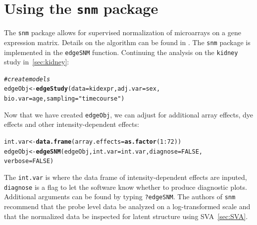 \documentclass{article}\usepackage[]{graphicx}\usepackage[]{color}
\makeatletter
\newcommand{\hlnum}[1]{\textcolor[rgb]{0.686,0.059,0.569}{#1}}%
\newcommand{\hlstr}[1]{\textcolor[rgb]{0.192,0.494,0.8}{#1}}%
\newcommand{\hlcom}[1]{\textcolor[rgb]{0.678,0.584,0.686}{\textit{#1}}}%
\newcommand{\hlopt}[1]{\textcolor[rgb]{0,0,0}{#1}}%
\newcommand{\hlstd}[1]{\textcolor[rgb]{0.345,0.345,0.345}{#1}}%
\newcommand{\hlkwb}[1]{\textcolor[rgb]{0.69,0.353,0.396}{#1}}%
\newcommand{\hlkwc}[1]{\textcolor[rgb]{0.333,0.667,0.333}{#1}}%
\newcommand{\hlkwd}[1]{\textcolor[rgb]{0.737,0.353,0.396}{\textbf{#1}}}%
\newenvironment{kframe}{%
 \def\at@end@of@kframe{}%
 \ifinner\ifhmode%
  \def\at@end@of@kframe{\end{minipage}}%
  \begin{minipage}{\columnwidth}%
 \fi\fi%
 \def\FrameCommand##1{\hskip\@totalleftmargin \hskip-\fboxsep
 \colorbox{shadecolor}{##1}\hskip-\fboxsep
     \hskip-\linewidth \hskip-\@totalleftmargin \hskip\columnwidth}%
 \MakeFramed {\advance\hsize-\width
   \@totalleftmargin\z@ \linewidth\hsize
   \@setminipage}}%
 {\par\unskip\endMakeFramed%
 \at@end@of@kframe}
\newenvironment{knitrout}{}{} %
\makeatother
\begin{document}
\section{Using the {\tt snm} package}
The {\tt snm} package allows for supervised normalization of microarrays on a gene expression matrix. Details on the algorithm can be found in \cite{mecham:2010}. The {\tt snm} package is implemented in the {\tt edgeSNM} function. Continuing the analysis on the {\tt kidney} study in~\ref{sec:kidney}:
\begin{knitrout}
\color{fgcolor}\begin{kframe}
\begin{alltt}
\hlcom{# create models}
\hlstd{edgeObj} \hlkwb{<-} \hlkwd{edgeStudy}\hlstd{(}\hlkwc{data} \hlstd{= kidexpr,} \hlkwc{adj.var} \hlstd{= sex,}
    \hlkwc{bio.var} \hlstd{= age,} \hlkwc{sampling} \hlstd{=} \hlstr{"timecourse"}\hlstd{)}
\end{alltt}
\end{kframe}
\end{knitrout}
Now that we have created {\tt edgeObj}, we can adjust for additional array effects, dye effects and other intensity-dependent effects:
\begin{knitrout}
\color{fgcolor}\begin{kframe}
\begin{alltt}
\hlstd{int.var} \hlkwb{<-} \hlkwd{data.frame}\hlstd{(}\hlkwc{array.effects} \hlstd{=} \hlkwd{as.factor}\hlstd{(}\hlnum{1}\hlopt{:}\hlnum{72}\hlstd{))}
\hlstd{edgeObj} \hlkwb{<-} \hlkwd{edgeSNM}\hlstd{(edgeObj,} \hlkwc{int.var} \hlstd{= int.var,} \hlkwc{diagnose} \hlstd{=} \hlnum{FALSE}\hlstd{,}
    \hlkwc{verbose} \hlstd{=} \hlnum{FALSE}\hlstd{)}
\end{alltt}
\end{kframe}
\end{knitrout}
The {\tt int.var} is where the data frame of intensity-dependent effects are inputed, {\tt diagnose} is a flag to let the software know whether to produce diagnostic plots. Additional arguments can be found by typing {\tt ?edgeSNM}. The authors of {\tt snm} recommend that the probe level data be analyzed on a log-transformed scale and that the normalized data be inspected for latent structure using SVA~\ref{sec:SVA}. 
\end{document}

